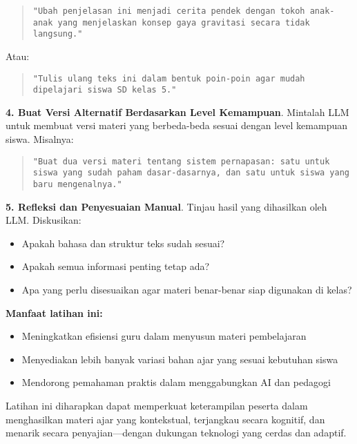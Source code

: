 \begin{quote}
	\centering
	\texttt{"Ubah penjelasan ini menjadi cerita pendek dengan tokoh anak-anak yang menjelaskan konsep gaya gravitasi secara tidak langsung."}
\end{quote}

Atau:

\begin{quote}
	\centering
	\texttt{"Tulis ulang teks ini dalam bentuk poin-poin agar mudah dipelajari siswa SD kelas 5."}
\end{quote}

\textbf{4. Buat Versi Alternatif Berdasarkan Level Kemampuan}.  
Mintalah LLM untuk membuat versi materi yang berbeda-beda sesuai dengan level kemampuan siswa. Misalnya:

\begin{quote}
	\centering
	\texttt{"Buat dua versi materi tentang sistem pernapasan: satu untuk siswa yang sudah paham dasar-dasarnya, dan satu untuk siswa yang baru mengenalnya."}
\end{quote}

\textbf{5. Refleksi dan Penyesuaian Manual}.  
Tinjau hasil yang dihasilkan oleh LLM. Diskusikan:
\begin{itemize}
	\item Apakah bahasa dan struktur teks sudah sesuai?
	\item Apakah semua informasi penting tetap ada?
	\item Apa yang perlu disesuaikan agar materi benar-benar siap digunakan di kelas?
\end{itemize}

\textbf{Manfaat latihan ini:}
\begin{itemize}
	\item Meningkatkan efisiensi guru dalam menyusun materi pembelajaran
	\item Menyediakan lebih banyak variasi bahan ajar yang sesuai kebutuhan siswa
	\item Mendorong pemahaman praktis dalam menggabungkan AI dan pedagogi
\end{itemize}

Latihan ini diharapkan dapat memperkuat keterampilan peserta dalam menghasilkan materi ajar yang kontekstual, terjangkau secara kognitif, dan menarik secara penyajian—dengan dukungan teknologi yang cerdas dan adaptif.

